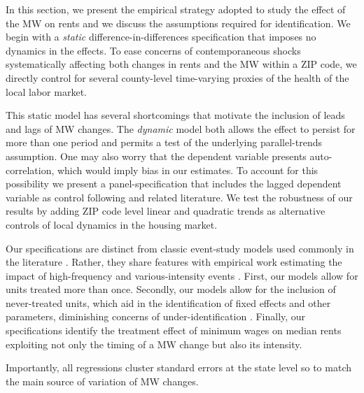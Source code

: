 
In this section, we present the empirical strategy adopted to study the effect of the 
MW on rents and we discuss the assumptions required for identification. We begin with 
a \textit{static} difference-in-differences specification that imposes no dynamics in 
the effects. To ease concerns of contemporaneous shocks systematically affecting both 
changes in rents and the MW within a ZIP code, we directly control for several 
county-level time-varying proxies of the health of the local labor market.

This static model has several shortcomings that motivate the inclusion of leads and 
lags of MW changes. The \textit{dynamic} model both allows the effect to persist for 
more than one period and permits a test of the underlying parallel-trends assumption. 
One may also worry that the dependent variable presents auto-correlation, which would 
imply bias in our estimates. To account for this possibility we present a 
panel-specification that includes the lagged dependent variable as control following 
\textcite{ArellanoBond1991} and related literature. We test the robustness of our 
results by adding ZIP code level linear and quadratic trends as alternative controls 
of local dynamics in the housing market. 

Our specifications are distinct from classic event-study models used commonly in the 
literature \parencite[discussed in, e.g.,][]{BorusyakJaravel2017, abraham2018}. Rather, 
they share features with empirical work estimating the impact of high-frequency and 
various-intensity events \parencite[see, e.g.,][]{Fuest2018, Suarez2016}.
First, our models allow for units treated more than once. Secondly, our models allow 
for the inclusion of never-treated units, which aid in the identification of fixed 
effects and other parameters, diminishing concerns of under-identification 
\parencite{BorusyakJaravel2017}. Finally, our specifications identify the treatment 
effect of minimum wages on median rents exploiting not only the timing of a MW change 
but also its intensity.

Importantly, all regressions cluster standard errors at the state level so to match the main 
source of variation of MW changes.

    
